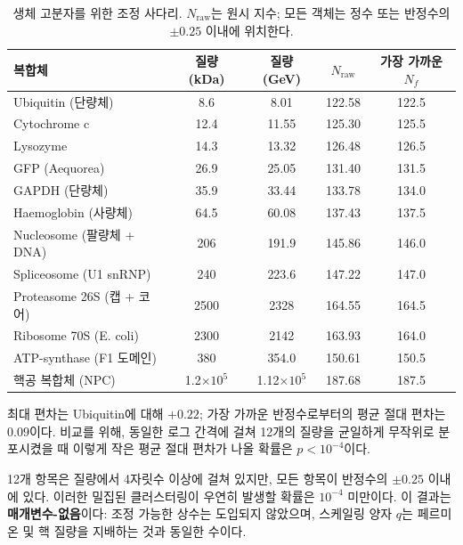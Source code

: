 \documentclass[12pt,a4paper]{article}
\begin{document}
	\begin{table}[H]
		\centering
		\caption{생체 고분자를 위한 조정 사다리. \(N_{\mathrm{raw}}\)는 원시 지수; 모든 객체는 정수 또는 반정수의 \(\pm 0.25\) 이내에 위치한다.}
		\label{tab:protein_masses}
		\small
		\begin{tabular}{l c c c c}
			\toprule
			복합체 & 질량 (kDa) & 질량 (GeV) & \(N_{\mathrm{raw}}\) & 가장 가까운 \(N_f\) \\
			\midrule
			Ubiquitin (단량체)          & 8.6   & 8.01  & 122.58 & 122.5 \\
			Cytochrome c                 & 12.4  & 11.55 & 125.30 & 125.5 \\
			Lysozyme                     & 14.3  & 13.32 & 126.48 & 126.5 \\
			GFP (Aequorea)               & 26.9  & 25.05 & 131.40 & 131.5 \\
			GAPDH (단량체)              & 35.9  & 33.44 & 133.78 & 134.0 \\
			Haemoglobin (사량체)        & 64.5  & 60.08 & 137.43 & 137.5 \\
			Nucleosome (팔량체 + DNA)   & 206   & 191.9 & 145.86 & 146.0 \\
			Spliceosome (U1 snRNP)       & 240   & 223.6 & 147.22 & 147.0 \\
			Proteasome 26S (캡 + 코어)  & 2500  & 2328  & 164.55 & 164.5 \\
			Ribosome 70S (E. coli)       & 2300  & 2142  & 163.93 & 164.0 \\
			ATP-synthase (F1 도메인)     & 380   & 354.0 & 150.61 & 150.5 \\
			핵공 복합체 (NPC)            & 1.2\(\times10^5\) & 1.12\(\times10^5\) & 187.68 & 187.5 \\
			\bottomrule
		\end{tabular}
		\par\smallskip
		\footnotesize
		최대 편차는 Ubiquitin에 대해 \(+0.22\); 가장 가까운 반정수로부터의 평균 절대 편차는 \(0.09\)이다. 비교를 위해, 동일한 로그 간격에 걸쳐 12개의 질량을 균일하게 무작위로 분포시켰을 때 이렇게 작은 평균 절대 편차가 나올 확률은 \(p < 10^{-4}\)이다.
	\end{table}
	
	12개 항목은 질량에서 4자릿수 이상에 걸쳐 있지만, 모든 항목이 반정수의 \(\pm 0.25\) 이내에 있다. 이러한 밀집된 클러스터링이 우연히 발생할 확률은 \(10^{-4}\) 미만이다. 이 결과는 \textbf{매개변수-없음}이다: 조정 가능한 상수는 도입되지 않았으며, 스케일링 양자 \(q\)는 페르미온 및 핵 질량을 지배하는 것과 동일한 수이다.
	
\end{document}
